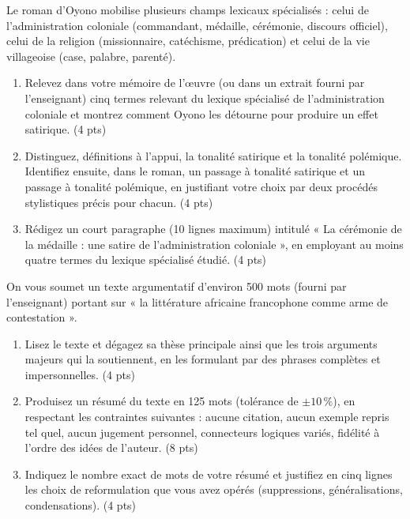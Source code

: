 \documentclass[11pt]{article}
\begin{document}
\begin{exercice}
Le roman d'Oyono mobilise plusieurs champs lexicaux spécialisés : celui de l'administration coloniale (commandant, médaille, cérémonie, discours officiel), celui de la religion (missionnaire, catéchisme, prédication) et celui de la vie villageoise (case, palabre, parenté).
\begin{enumerate}
\item Relevez dans votre mémoire de l'œuvre (ou dans un extrait fourni par l'enseignant) cinq termes relevant du lexique spécialisé de l'administration coloniale et montrez comment Oyono les détourne pour produire un effet satirique. (4 pts)
\item Distinguez, définitions à l'appui, la tonalité satirique et la tonalité polémique. Identifiez ensuite, dans le roman, un passage à tonalité satirique et un passage à tonalité polémique, en justifiant votre choix par deux procédés stylistiques précis pour chacun. (4 pts)
\item Rédigez un court paragraphe (10 lignes maximum) intitulé « La cérémonie de la médaille : une satire de l'administration coloniale », en employant au moins quatre termes du lexique spécialisé étudié. (4 pts)
\end{enumerate}
\end{exercice}

\begin{exercice}
On vous soumet un texte argumentatif d'environ 500 mots (fourni par l'enseignant) portant sur « la littérature africaine francophone comme arme de contestation ».
\begin{enumerate}
\item Lisez le texte et dégagez sa thèse principale ainsi que les trois arguments majeurs qui la soutiennent, en les formulant par des phrases complètes et impersonnelles. (4 pts)
\item Produisez un résumé du texte en 125 mots (tolérance de $\pm 10\,\%$), en respectant les contraintes suivantes : aucune citation, aucun exemple repris tel quel, aucun jugement personnel, connecteurs logiques variés, fidélité à l'ordre des idées de l'auteur. (8 pts)
\item Indiquez le nombre exact de mots de votre résumé et justifiez en cinq lignes les choix de reformulation que vous avez opérés (suppressions, généralisations, condensations). (4 pts)
\end{enumerate}
\end{exercice}
\end{document}
